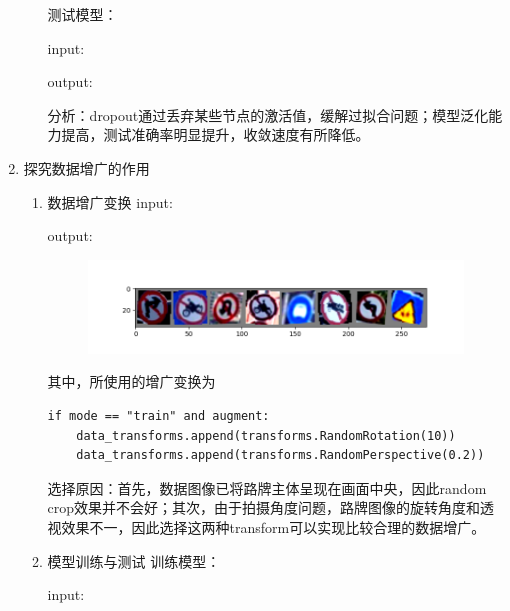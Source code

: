 \documentclass[a4paper]{article}
\begin{document}
\begin{enumerate}
\begin{enumerate}
        测试模型：

        input:
        

        output:
        

        分析：dropout通过丢弃某些节点的激活值，缓解过拟合问题；模型泛化能力提高，测试准确率明显提升，收敛速度有所降低。

    \end{enumerate}
    \vspace{2em}


    \item 探究数据增广的作用
    \begin{enumerate}
        \item 数据增广变换
        input:
        

        output:
        
        \begin{figure}[H]
            \centering
            \includegraphics[width=\linewidth]{../result/2_1.png}
            \caption{}
        \end{figure}

        其中，所使用的增广变换为
        \begin{lstlisting}[style=Python]
if mode == "train" and augment:
    data_transforms.append(transforms.RandomRotation(10))
    data_transforms.append(transforms.RandomPerspective(0.2))
        \end{lstlisting}

        选择原因：首先，数据图像已将路牌主体呈现在画面中央，因此random crop效果并不会好；其次，由于拍摄角度问题，路牌图像的旋转角度和透视效果不一，因此选择这两种transform可以实现比较合理的数据增广。
        \vspace{2em}

        \item 模型训练与测试
        训练模型：

        input:
        


\end{enumerate}
\end{enumerate}
\end{document}
